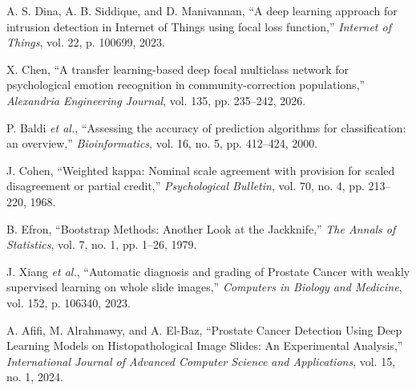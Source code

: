  A. S. Dina, A. B. Siddique, and D. Manivannan, ``A deep learning approach for intrusion detection in Internet of Things using focal loss function,'' \textit{Internet of Things}, vol. 22, p. 100699, 2023.

 X. Chen, ``A transfer learning-based deep focal multiclass network for psychological emotion recognition in community-correction populations,'' \textit{Alexandria Engineering Journal}, vol. 135, pp. 235--242, 2026.

 P. Baldi \textit{et al.}, ``Assessing the accuracy of prediction algorithms for classification: an overview,'' \textit{Bioinformatics}, vol. 16, no. 5, pp. 412--424, 2000.

 J. Cohen, ``Weighted kappa: Nominal scale agreement with provision for scaled disagreement or partial credit,'' \textit{Psychological Bulletin}, vol. 70, no. 4, pp. 213--220, 1968.

 B. Efron, ``Bootstrap Methods: Another Look at the Jackknife,'' \textit{The Annals of Statistics}, vol. 7, no. 1, pp. 1--26, 1979.

 J. Xiang \textit{et al.}, ``Automatic diagnosis and grading of Prostate Cancer with weakly supervised learning on whole slide images,'' \textit{Computers in Biology and Medicine}, vol. 152, p. 106340, 2023.

 A. Afifi, M. Alrahmawy, and A. El-Baz, ``Prostate Cancer Detection Using Deep Learning Models on Histopathological Image Slides: An Experimental Analysis,'' \textit{International Journal of Advanced Computer Science and Applications}, vol. 15, no. 1, 2024.